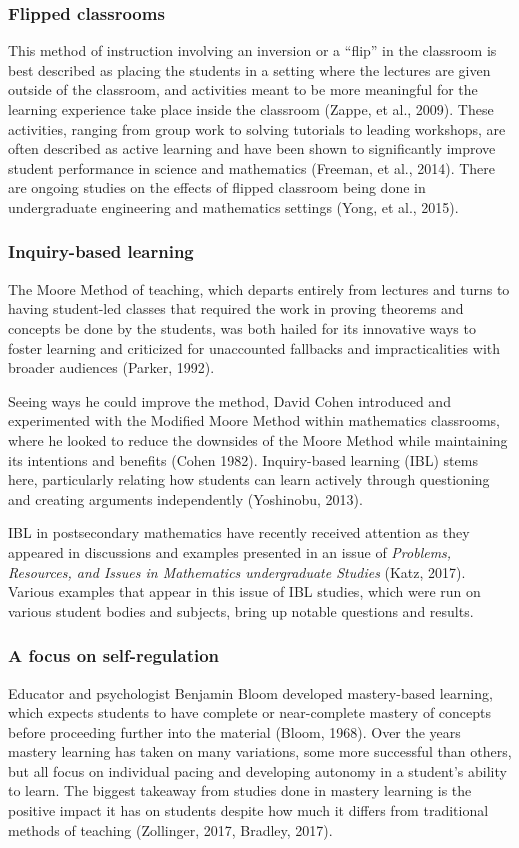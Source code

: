 \subsubsection{Flipped classrooms}
This method of instruction involving an inversion or a ``flip'' in the classroom is best described as placing the students in a setting where the lectures are given outside of the classroom, and activities meant to be more meaningful for the learning experience take place inside the classroom (Zappe, et al., 2009). These activities, ranging from group work to solving tutorials to leading workshops, are often described as active learning and have been shown to significantly improve student performance in science and mathematics (Freeman, et al., 2014). There are ongoing studies on the effects of flipped classroom being done in undergraduate engineering and mathematics settings (Yong, et al., 2015).

\subsubsection{Inquiry-based learning}
The Moore Method of teaching, which departs entirely from lectures and turns to having student-led classes that required the work in proving theorems and concepts be done by the students, was both hailed for its innovative ways to foster learning and criticized for unaccounted fallbacks and impracticalities with broader audiences (Parker, 1992).

Seeing ways he could improve the method, David Cohen introduced and experimented with the Modified Moore Method within mathematics classrooms, where he looked to reduce the downsides of the Moore Method while maintaining its intentions and benefits (Cohen 1982). Inquiry-based learning (IBL) stems here, particularly relating how students can learn actively through questioning and creating arguments independently (Yoshinobu, 2013).

IBL in postsecondary mathematics have recently received attention as they appeared in discussions and examples presented in an issue of {\it Problems, Resources, and Issues in Mathematics undergraduate Studies} (Katz, 2017). Various examples that appear in this issue of IBL studies, which were run on various student bodies and subjects, bring up notable questions and results.

\subsubsection{A focus on self-regulation}
Educator and psychologist Benjamin Bloom developed mastery-based learning, which expects students to have complete or near-complete mastery of concepts before proceeding further into the material (Bloom, 1968). Over the years mastery learning has taken on many variations, some more successful than others, but all focus on individual pacing and developing autonomy in a student's ability to learn. The biggest takeaway from studies done in mastery learning is the positive impact it has on students despite how much it differs from traditional methods of teaching (Zollinger, 2017, Bradley, 2017).

